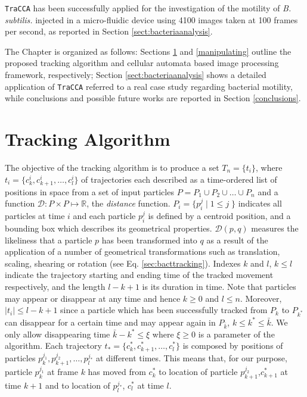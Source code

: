 \texttt{TraCCA} has been successfully applied for the investigation of the motility of \textit{B. subtilis.} injected in a micro-fluidic device using 4100 images taken at 100 frames per second, as reported in Section \ref{sect:bacteriaanalysis}.

The Chapter is organized as follows: Sections  \ref{trackalgorithm} and \ref{manipulating} outline the proposed tracking algorithm and cellular automata based image processing framework, respectively; Section \ref{sect:bacteriaanalysis} shows a detailed application of \texttt{TraCCA} referred to a real case study regarding bacterial motility, while conclusions and possible future works are reported in Section \ref{conclusions}.


\section{Tracking Algorithm}\label{trackalgorithm}
The objective of the tracking algorithm is to produce a 
set $ T_n = \{ t_i \}$, where $t_i=\{ c^i_k,c^i_{k+1},\ldots,c^i_l \} $ 
of trajectories each described as a time-ordered list of positions in space from a set of input 
particles $P=P_1 \cup P_2 \cup \ldots \cup P_n$ and a function $\mathcal{D} :  P \times P \mapsto \mathbb{R}$, 
the \textit{distance} function. $P_i = \{p^j_i \; | \; 1 \leq j\; \}$ indicates all particles at time $i$ and each particle $p_i^j$ is defined by a centroid position, and a bounding box which describes its geometrical properties.
$\mathcal{D}(p,q)$ measures the likeliness that a particle $p$ has been transformed into $q$ as a result of the application of a number of geometrical transformations such as translation, scaling, shearing or rotation (see Eq. \ref{sec:bacttracking}). 
Indexes $k$ and $l$, $k \leq l$ indicate the trajectory starting and ending time of the tracked movement respectively, and the length $l-k+1$ is its duration in time.
Note that particles may appear or disappear at any time and hence $k\geq 0$ and $l \leq n$. Moreover, $|t_i| \leq l-k+1$ since a particle which has been successfully tracked
 from  $P_k$ to $P_{k^*} $ can disappear for a certain time and may appear again in $P_{\bar{k}}$, $k \leq k^* \leq \bar{k}$. We only allow disappearing time $\bar{k}-k^* \leq \xi$ where $\xi \geq 0$ is a parameter of the algorithm. 
Each trajectory  $t_*=\{ c^*_k,c^*_{k+1},\ldots,c^*_l \} $ is composed by  positions of particles $p^{j_1}_k,p^{j_2}_{k+1},\ldots,p^{j_*}_l$ at different times. 
This means that, for our purpose, particle $p^{j_1}_k$ at frame $k$ has moved from $c^*_k$ to location of particle $p^{j_2}_{k+1}$,$c^*_{k+1}$ at time ${k+1}$ and to location of $p^{j_*}_{l}$, $c^*_l$ at time $l$. 

